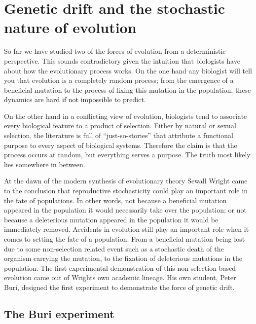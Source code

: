 \section{Genetic drift and the stochastic nature of evolution}

So far we have studied two of the forces of evolution from a deterministic
perspective. This sounds contradictory given the intuition that biologists have
about how the evolutionary process works. On the one hand any biologist will
tell you that evolution is a completely random process; from the emergence of a
beneficial mutation to the process of fixing this mutation in the population,
these dynamics are hard if not impossible to predict.

On the other hand in a conflicting view of evolution, biologists tend to
associate every biological feature to a product of selection. Either by natural
or sexual selection, the literature is full of ``just-so-stories'' that
attribute a functional purpose to every aspect of biological systems. Therefore
the claim is that the process occurs at random, but everything serves a
purpose. The truth most likely lies somewhere in between.

At the dawn of the modern synthesis of evolutionary theory Sewall Wright came
to the conclusion that reproductive stochasticity could play an important role
in the fate of populations. In other words, not because a beneficial mutation
appeared in the population it would necessarily take over the population; or
not because a deleterious mutation appeared in the population it would be
immediately removed. Accidents in evolution still play an important role when
it comes to setting the fate of a population. From a beneficial mutation being
lost due to some non-selection related event such as a stochastic death of the
organism carrying the mutation, to the fixation of deleterious mutations in the
population. The first experimental demonstration of this non-selection based
evolution came out of Wrights own academic lineage. His own student, Peter
Buri, designed the first experiment to demonstrate the force of genetic drift.

\subsection{The Buri experiment}


